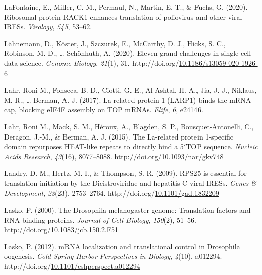 \documentclass[12pt,oneside]{reedthesis}
\newlength{\cslhangindent}
\newenvironment{CSLReferences}[2] %
 {%
  \setlength{\parindent}{0pt}
  \ifodd #1 \everypar{\setlength{\hangindent}{\cslhangindent}}\ignorespaces\fi
  \ifnum #2 > 0
  \setlength{\parskip}{#2\baselineskip}
  \fi
 }%
 {}
\begin{document}
\begin{CSLReferences}{1}{0}
\leavevmode{}%
LaFontaine, E., Miller, C. M., Permaul, N., Martin, E. T., \& Fuchs, G. (2020). Ribosomal protein {RACK1} enhances translation of poliovirus and other viral {IRESs}. \emph{Virology}, \emph{545}, 53--62.

\leavevmode{}%
Lähnemann, D., Köster, J., Szczurek, E., McCarthy, D. J., Hicks, S. C., Robinson, M. D., \ldots{} Schönhuth, A. (2020). Eleven grand challenges in single-cell data science. \emph{Genome Biology}, \emph{21}(1), 31. http://doi.org/\href{https://doi.org/10.1186/s13059-020-1926-6}{10.1186/s13059-020-1926-6}

\leavevmode{}%
Lahr, Roni M., Fonseca, B. D., Ciotti, G. E., Al-Ashtal, H. A., Jia, J.-J., Niklaus, M. R., \ldots{} Berman, A. J. (2017). La-related protein 1 ({LARP1}) binds the {mRNA} cap, blocking {eIF4F} assembly on {TOP mRNAs}. \emph{Elife}, \emph{6}, e24146.

\leavevmode{}%
Lahr, Roni M., Mack, S. M., Héroux, A., Blagden, S. P., Bousquet-Antonelli, C., Deragon, J.-M., \& Berman, A. J. (2015). The {La-related} protein 1-specific domain repurposes {HEAT-like} repeats to directly bind a 5{\({'}\)}{TOP} sequence. \emph{Nucleic Acids Research}, \emph{43}(16), 8077--8088. http://doi.org/\href{https://doi.org/10.1093/nar/gkv748}{10.1093/nar/gkv748}

\leavevmode{}%
Landry, D. M., Hertz, M. I., \& Thompson, S. R. (2009). {RPS25} is essential for translation initiation by the {Dicistroviridae} and hepatitis {C} viral {IRESs}. \emph{Genes \& Development}, \emph{23}(23), 2753--2764. http://doi.org/\href{https://doi.org/10.1101/gad.1832209}{10.1101/gad.1832209}

\leavevmode{}%
Lasko, P. (2000). The {Drosophila} melanogaster genome: {Translation} factors and {RNA} binding proteins. \emph{Journal of Cell Biology}, \emph{150}(2), 51--56. http://doi.org/\href{https://doi.org/10.1083/jcb.150.2.F51}{10.1083/jcb.150.2.F51}

\leavevmode{}%
Lasko, P. (2012). {mRNA} localization and translational control in {Drosophila} oogenesis. \emph{Cold Spring Harbor Perspectives in Biology}, \emph{4}(10), a012294. http://doi.org/\href{https://doi.org/10.1101/cshperspect.a012294}{10.1101/cshperspect.a012294}


\end{CSLReferences}
\end{document}
